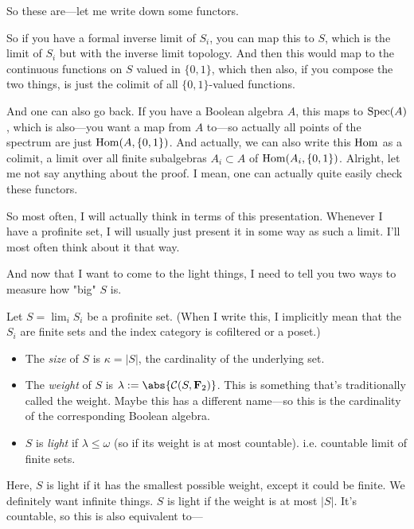 So these are---let me write down some functors.


So if you have a formal inverse limit of $S_i$, you can map this to $S$, which is the limit of $S_i$ but with the inverse limit topology. 
And then this would map to the continuous functions on $S$ valued in $\{0,1\}$, which then also, if you compose the two things, is just the colimit of all $\{0,1\}$-valued functions.

And one can also go back. If you have a Boolean algebra $A$, this maps to $\operatorname{Spec}(A)$, which is also---you want a map from $A$ to---so actually all points of the spectrum are just $\operatorname{Hom}(A, \{0,1\})$. And actually, we can also write this $\operatorname{Hom}$ as a colimit, a limit over all finite subalgebras $A_i \subset A$ of $\operatorname{Hom}(A_i, \{0,1\})$. Alright, let me not say anything about the proof. I mean, one can actually quite easily check these functors.

So most often, I will actually think in terms of this presentation. Whenever I have a profinite set, I will usually just present it in some way as such a limit. I'll most often think about it that way.

And now that I want to come to the light things, I need to tell you two ways to measure how "big" $S$ is. 

\begin{definition}
Let $S = \lim_{i} S_i$ be a profinite set. (When I write this, I implicitly mean that the $S_i$ are finite sets and the index category is cofiltered or a poset.)

\begin{itemize}
\item The \emph{size} of $S$ is $\kappa = |S|$, the cardinality of the underlying set. 
\item The \emph{weight} of $S$ is  $\lambda := \abs{\Cont(S, \F_2)}$. This is something that's traditionally called the weight. Maybe this has a different name---so this is the cardinality of the corresponding Boolean algebra.
\item $S$ is \emph{light} if $\lambda \leq \omega$ (so if its weight is at most countable). i.e. countable limit of finite sets.
\end{itemize}

Here, $S$ is light if it has the smallest possible weight, except it could be finite. We definitely want infinite things. $S$ is light if the weight is at most $|S|$. It's countable, so this is also equivalent to--- 

\end{definition}

